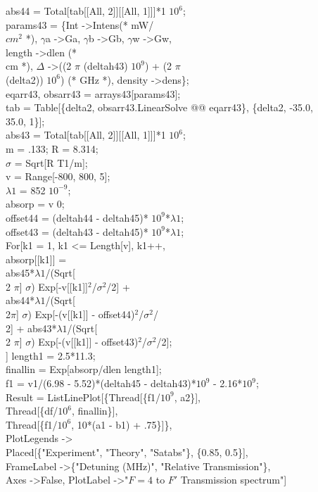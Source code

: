 \begin{enumerate}
{abs44 = Total[tab[[All, 2]][[All, 1]]]*1 $10^{6}$;\\
params43 = \{Int -\textgreater Intens(* mW/\\
   $cm^2$ *), $\gamma$a -\textgreater Ga, $\gamma$b -\textgreater Gb, $\gamma$w -\textgreater Gw, \\
   length -\textgreater dlen (* \\
   cm *), $\Delta$ -\textgreater ((2 $\pi$ (deltah43) $10^{9}$) + (2 $\pi$ \\
(delta2)) $10^6$) (* GHz *), density -\textgreater dens\};\\
{eqarr43, obsarr43} = arrays43[params43];\\
tab = Table[\{delta2, obsarr43.LinearSolve @@ eqarr43\}, \{delta2, -35.0,\\
     35.0, 1\}];\\
abs43 = Total[tab[[All, 2]][[All, 1]]]*1 $10^{6}$;\\


m = .133; R = 8.314;\\
$\sigma$ = Sqrt[R T1/m];\\
v = Range[-800, 800, 5];\\
$\lambda 1$ = 852 $10^{-9}$;\\
absorp = v 0;\\
offset44 = (deltah44 - deltah45)* $10^{9}$*$\lambda 1$;\\
offset43 = (deltah43 - deltah45)* $10^{9}$*$\lambda 1$;\\
For[k1 = 1, k1 \textless= Length[v], k1++,\\
 absorp[[k1]] = \\
   abs45*$\lambda 1$/(Sqrt[\\
         2 $\pi$] $\sigma$) Exp[-v[[k1]]$^2$/$\sigma^2$/2] + \\
    abs44*$\lambda 1$/(Sqrt[\\
         2$\pi$] $\sigma$) Exp[-(v[[k1]] - offset44)$^2$/$\sigma^2$/ \\
       2] + abs43*$\lambda 1$/(Sqrt[\\
         2 $\pi$] $\sigma$) Exp[-(v[[k1]] - offset43)$^2$/$\sigma^2$/2];\\
 ]
length1 = 2.5*11.3; \\
finallin = Exp[absorp/dlen length1];\\
f1 = v1/(6.98 - 5.52)*(deltah45 - deltah43)*$10^{9}$ - 2.16*$10^{9}$;\\
Result = ListLinePlot[\{Thread[\{f1/$10^{9}$, a2\}], \\
   Thread[\{df/$10^{6}$, finallin\}], \\
   Thread[\{f1/$10^{6}$, 10*(a1 - b1) + .75\}]\}, \\
  PlotLegends -\textgreater \\
   Placed[\{"Experiment", "Theory", "Satabs"\}, \{0.85, 0.5\}], \\
  FrameLabel -\textgreater \{"Detuning (MHz)", "Relative Transmission"\}, \\
  Axes -\textgreater False, PlotLabel -\textgreater "$F=4$ to $F'$ Transmission spectrum"]\\

}
\end{enumerate}

